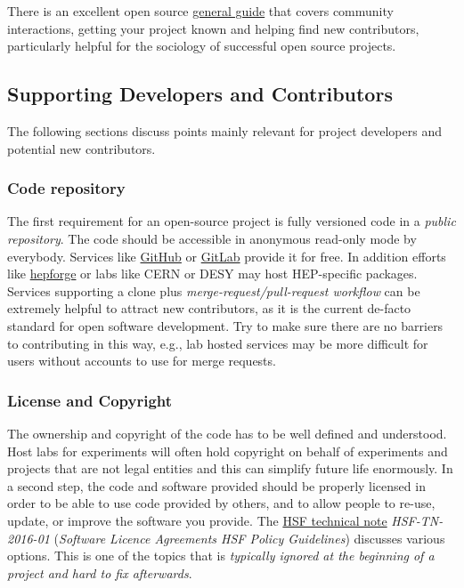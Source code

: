 \documentclass[12pt,a4paper]{article}
\begin{document}
There is an excellent open source
\href{https://opensource.guide/}{general guide} that covers community
interactions, getting your project known and helping find new
contributors, particularly helpful for the sociology of successful open
source projects.

\subsection{Supporting Developers and
Contributors}\label{supporting-developers-and-contributors}

The following sections discuss points mainly relevant for project
developers and potential new contributors.

\subsubsection{Code repository}\label{code-repository}

The first requirement for an open-source project is fully versioned code
in a \emph{public repository}. The code should be accessible in
anonymous read-only mode by everybody. Services like
\href{https://github.com}{GitHub} or \href{https://gitlab.com}{GitLab}
provide it for free. In addition efforts like
\href{https://www.hepforge.org/}{hepforge} or labs like CERN or DESY may
host HEP-specific packages. Services supporting a clone plus
\emph{merge-request/pull-request workflow} can be extremely helpful to
attract new contributors, as it is the current de-facto standard for
open software development. Try to make sure there are no barriers to
contributing in this way, e.g., lab hosted services may be more
difficult for users without accounts to use for merge requests.

\subsubsection{License and Copyright}\label{license-and-copyright}

The ownership and copyright of the code has to be well defined and
understood. Host labs for experiments will often hold copyright on
behalf of experiments and projects that are not legal entities and this
can simplify future life enormously. In a second step, the code and
software provided should be properly licensed in order to be able to use
code provided by others, and to allow people to re-use, update, or
improve the software you provide. The
\href{http://hepsoftwarefoundation.org/technical_notes.html}{HSF
technical note} \emph{HSF-TN-2016-01} (\emph{Software Licence Agreements
HSF Policy Guidelines}) discusses various options. This is one of the
topics that is \emph{typically ignored at the beginning of a project and
hard to fix afterwards}.
\end{document}
